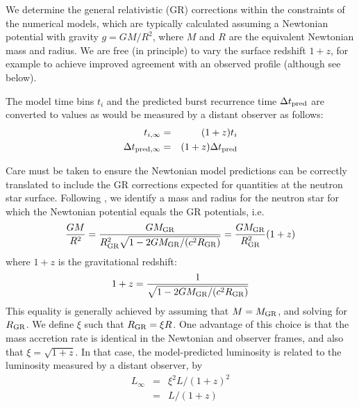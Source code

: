 \documentclass{aastex63}
\begin{document}
We determine the general relativistic (GR) corrections within the constraints of the numerical models, which are typically calculated assuming a Newtonian potential with gravity $g=GM/R^2$, where $M$ and $R$ are the equivalent Newtonian mass and radius.
%
We are free (in principle) to vary the surface redshift $1+z$, for example to achieve improved agreement with an observed profile (although see below). 

The model time bins  $t_i$ and the predicted burst recurrence time $\Delta t_{\rm pred}$ are converted to values as would be measured by a distant observer as follows:
\begin{eqnarray}
t_{i,\infty} & = & (1+z)t_i \\
\Delta t_{{\rm pred},\infty} & = & (1+z)\Delta t_{\rm pred}
\end{eqnarray}

Care must be taken to ensure the Newtonian model predictions can be correctly translated to include the GR corrections expected for quantities at the neutron star surface.
%
Following \cite{lampe16}, 
we identify a mass and radius for the neutron star for which the Newtonian potential equals the GR potentials, i.e.
\begin{equation}
\frac{GM}{R^2} = \frac{GM_{\rm GR}}{R^2_{\rm GR}\sqrt{1-2GM_{\rm GR}/(c^2R_{\rm GR})}} = \frac{GM_{\rm GR}}{R^2_{\rm GR}}(1+z)
\end{equation}
where $1+z$ is the gravitational redshift:
\begin{equation}
1+z = \frac{1}{\sqrt{1-2GM_{\rm GR}/(c^2R_{\rm GR})}}
\end{equation}
This equality is generally achieved by assuming that $M=M_{\rm GR}$, and solving for $R_{\rm GR}$. 
We define $\xi$ such that $R_{\rm GR}=\xi R$. 
One advantage of this choice is that the mass accretion rate is identical in the Newtonian and observer frames, and also that $\xi = \sqrt{1 + z}$. In that case, the model-predicted luminosity is related to the luminosity measured by a distant observer, by 
\begin{eqnarray}
L_\infty & = & \xi^2L/(1+z)^2 \nonumber \\
& = & L/(1+z)
\end{eqnarray}
\end{document}
